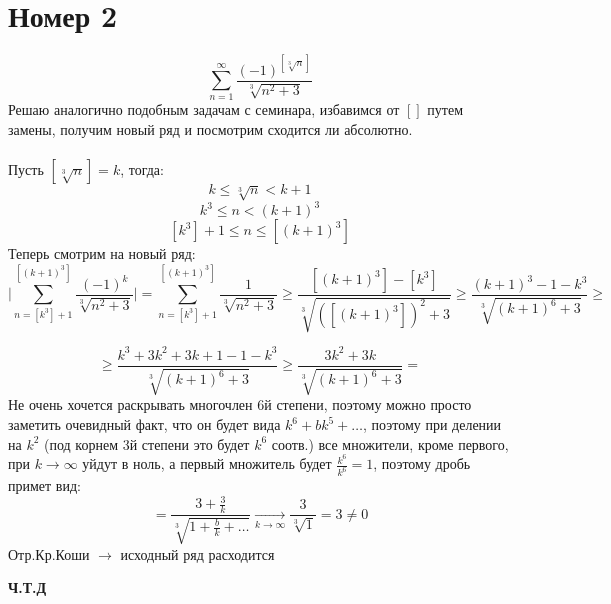 \documentclass[a4paper,12pt]{article}
\begin{document}
\section*{Номер 2}
\[
\sum_{n=1}^{\infty}\frac{(-1)^{\left[\sqrt[3]{n}\right]}}{\sqrt[3]{n^2 + 3}}
\] 
Решаю аналогично подобным задачам с семинара, избавимся от $\left[\right]$ путем замены, получим новый ряд и посмотрим сходится ли абсолютно. 
\\\\
Пусть $\left[\sqrt[3]{n}\right] = k$, тогда:
\[
k \leq \sqrt[3]{n} < k + 1 
\]
\[
k^3 \leq n < (k + 1)^3
\]
\[
\left[k^3\right] + 1 \leq n \leq \left[(k + 1) ^3 \right]
\]
Теперь смотрим на новый ряд:
\[
\Bigg|
\sum_{n = \left[k^3\right] + 1}^{\left[(k+1)^3\right]} \frac{(-1)^k}{\sqrt[3]{n^2 + 3}} \Bigg| = \sum_{n = \left[k^3\right] + 1}^{\left[(k+1)^3\right]} \frac{1}{\sqrt[3]{n^2 + 3}} \geq  \frac{\left[(k+1)^3\right] - \left[k^3\right]}{\sqrt[3]{(\left[(k+1)^3\right])^2 + 3}} \geq \frac{(k+1)^3 - 1 - k^3}{\sqrt[3]{(k+1)^6 + 3}} \geq \]

\[
\geq \frac{k^3 + 3k^2 + 3k + 1 -1  -k^3 }{\sqrt[3]{(k + 1)^6 + 3}} \geq \frac{3k^2 + 3k}{\sqrt[3]{(k + 1)^6 + 3}} =
\]
Не очень хочется раскрывать многочлен 6й степени, поэтому можно просто заметить очевидный факт, что он будет вида $k^6 + bk^5 + \ldots$, поэтому при делении на $k^2$ (под корнем 3й степени это будет $k^6$ соотв.) все множители, кроме первого, при $k \rightarrow \infty$ уйдут в ноль, а первый множитель будет $\frac{k^6}{k^6} = 1$, поэтому дробь примет вид:
\[
= \frac{3 + \frac{3}{k}}{\sqrt[3]{1 + \frac{b}{k} + \ldots}} \underset{k \rightarrow \infty}{\longrightarrow} \frac{3}{\sqrt[3]{1}} = 3 \neq 0 
\]
Отр.Кр.Коши $\rightarrow$ исходный ряд расходится
\begin{center}
\textbf{Ч.Т.Д } 
\end{center}
\end{document}
